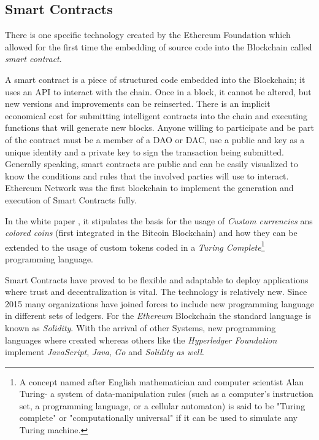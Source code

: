 \subsection{Smart Contracts}
\label{ch:approach:intro:smartcontracts}

There is one specific technology created by the Ethereum Foundation which allowed for the first time the embedding of source code into the Blockchain called \emph{smart contract}.

A smart contract is a piece of structured code embedded into the Blockchain; it uses an \ac{API} to interact with the chain. Once in a block, it cannot be altered, but new versions and improvements can be reinserted. There is an implicit economical cost for submitting intelligent contracts into the chain and executing functions that will generate new blocks. Anyone willing to participate and be part of the contract must be a member of a \ac{DAO} or \ac{DAC}, use a public and key as a unique identity and a private key to sign the transaction being submitted. Generally speaking, smart contracts are public and can be easily visualized to know the conditions and rules that the involved parties will use to interact. Ethereum Network was the first blockchain to implement the generation and execution of Smart Contracts fully. 

In the white paper \cite{Ethereum30:online}, it stipulates the basis for the usage of \emph{Custom currencies} ans \emph{colored coins} (first integrated in the Bitcoin Blockchain) and how they can be extended to the usage of custom tokens coded in a \emph{Turing Complete}\footnote{A concept named after English mathematician and computer scientist Alan Turing- a system of data-manipulation rules (such as a computer's instruction set, a programming language, or a cellular automaton) is said to be "Turing complete" or "computationally universal" if it can be used to simulate any Turing machine.} programming language.

Smart Contracts have proved to be flexible and adaptable to deploy applications where trust and decentralization is vital. The technology is relatively new. Since 2015 many organizations have joined forces to include new programming language in different sets of ledgers. For the \emph{Ethereum} Blockchain the standard language is known as \emph{Solidity}\cite{SolidityEthereum:online}. With the arrival of other Systems, new programming languages where created whereas others like the  \emph{Hyperledger Foundation} implement \emph{JavaScript}, \emph{Java}, \emph{Go} and \emph{Solidity as well}.

